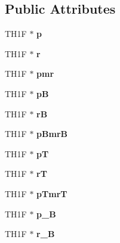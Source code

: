 \subsection*{Public Attributes}
\begin{DoxyCompactItemize}
\item 
\hypertarget{classhists_a41afed096ec22360010c5394780ae311}{T\-H1\-F $\ast$ {\bfseries p}}\label{classhists_a41afed096ec22360010c5394780ae311}

\item 
\hypertarget{classhists_aff8415e0daed67934f5b5d22dc2833e9}{T\-H1\-F $\ast$ {\bfseries r}}\label{classhists_aff8415e0daed67934f5b5d22dc2833e9}

\item 
\hypertarget{classhists_a7deeb53d1622c43f1de1459c37554181}{T\-H1\-F $\ast$ {\bfseries pmr}}\label{classhists_a7deeb53d1622c43f1de1459c37554181}

\item 
\hypertarget{classhists_a7e962900e2acf6aad5a34b37e8f7120b}{T\-H1\-F $\ast$ {\bfseries p\-B}}\label{classhists_a7e962900e2acf6aad5a34b37e8f7120b}

\item 
\hypertarget{classhists_ade9c18d36c628ca168263749aec46881}{T\-H1\-F $\ast$ {\bfseries r\-B}}\label{classhists_ade9c18d36c628ca168263749aec46881}

\item 
\hypertarget{classhists_a0ebe4e7e00a621e903d2badca471bb76}{T\-H1\-F $\ast$ {\bfseries p\-Bmr\-B}}\label{classhists_a0ebe4e7e00a621e903d2badca471bb76}

\item 
\hypertarget{classhists_a37b47338868009d91a4a9faee7d00d44}{T\-H1\-F $\ast$ {\bfseries p\-T}}\label{classhists_a37b47338868009d91a4a9faee7d00d44}

\item 
\hypertarget{classhists_a61cf4fec0530bd16c881acc84a9f74d6}{T\-H1\-F $\ast$ {\bfseries r\-T}}\label{classhists_a61cf4fec0530bd16c881acc84a9f74d6}

\item 
\hypertarget{classhists_a7e36a011237a42752b9f0e7b464925a8}{T\-H1\-F $\ast$ {\bfseries p\-Tmr\-T}}\label{classhists_a7e36a011237a42752b9f0e7b464925a8}

\item 
\hypertarget{classhists_ab1c1ddba953f87c0f4c32279bc9485d6}{T\-H1\-F $\ast$ {\bfseries p\-\_\-B}}\label{classhists_ab1c1ddba953f87c0f4c32279bc9485d6}

\item 
\hypertarget{classhists_ad287fcf0e40907decc131b3bcbb7ff08}{T\-H1\-F $\ast$ {\bfseries r\-\_\-B}}\label{classhists_ad287fcf0e40907decc131b3bcbb7ff08}


\end{DoxyCompactItemize}
